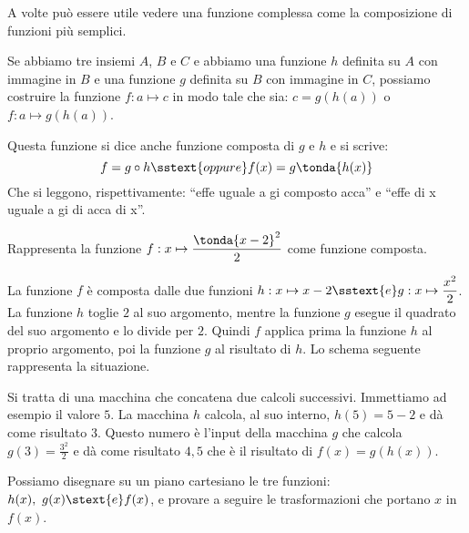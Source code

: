 A volte può essere utile vedere una funzione complessa come la 
composizione di funzioni più semplici. 

Se abbiamo tre insiemi \(A\), \(B\) e \(C\) e abbiamo una funzione \(h\) 
definita su \(A\) con immagine in \(B\) e una funzione \(g\) definita su 
\(B\) con immagine in \(C\), possiamo costruire la funzione 
\(f: a \mapsto c\) in modo tale che sia: 
\(c=g(h(a))\) o \(f: a \mapsto g(h(a))\).

\begin{center}
\end{center}

Questa funzione si dice anche funzione composta di \(g\) e \(h\) e si scrive:
\[f = g \circ h \sstext{oppure} f(x) = g \tonda{h(x)}\]
Che si leggono, rispettivamente: ``effe uguale a gi composto acca''
e ``effe di x uguale a gi di acca di x''.

\begin{esempio}
Rappresenta la funzione  \(f: x \mapsto \dfrac{\tonda{x -2}^2}{2}\)
come funzione composta. 

La funzione \(f\) è composta dalle due funzioni 
\(h: x \mapsto x -2 \sstext{e} g: x \mapsto \dfrac{x^2}{2}\). \quad 
La funzione 
\(h\) toglie \(2\) al suo argomento, mentre la funzione 
\(g\) esegue il quadrato del suo argomento e lo divide per \(2\).
Quindi \(f\) applica prima la funzione \(h\) al proprio argomento, poi la 
funzione \(g\) al risultato di \(h\).
Lo schema seguente rappresenta la situazione.

\hspace{5mm}\scalebox{.8}{\boxfunzionecompostaa} 
\label{gra:differenziazione_boxcompostaa}

Si tratta di una macchina che concatena due calcoli successivi. 
Immettiamo ad esempio il valore \(5\). 
La macchina \(h\) calcola, al suo interno, \(h(5)=5-2\) e dà come 
risultato \(3\).
Questo numero è l'input della macchina \(g\) che calcola 
\(g(3)=\frac{3^2}{2}\) e dà come risultato \(4,5\)
che è il risultato di \(f(x) = g(h(x))\).

Possiamo disegnare su un piano cartesiano le tre funzioni: 
\(h(x),~g(x) \stext{e} f(x)\), e provare a seguire le trasformazioni che 
portano \(x\) in \(f(x)\).

\end{esempio}

